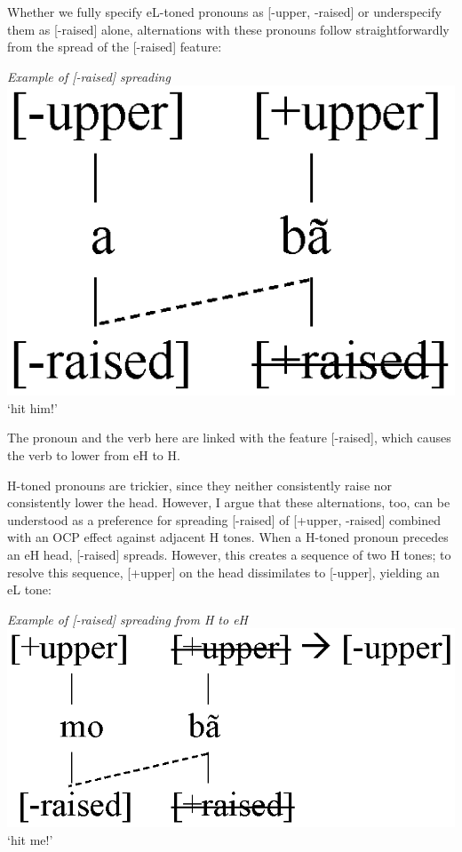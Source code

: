 \documentclass[output=paper]{langsci/langscibook}
\begin{document}
Whether we fully specify eL-toned pronouns as [-upper, -raised] or underspecify them as [-raised] alone, alternations with these pronouns follow straightforwardly from the spread of the [-raised] feature:

\ea\label{ex:mcpherson:22} {\it Example of [-raised] spreading} \\
\includegraphics[scale=.5]{figures/Lspread2.eps} \\
`hit him!' \\
\z

The pronoun and the verb here are linked with the feature [-raised], which causes the verb to lower from eH to H. 

H-toned pronouns are trickier, since they neither consistently raise nor consistently lower the head. However, I argue that these alternations, too, can be understood as a preference for spreading [-raised] of [+upper, -raised] combined with an OCP effect against adjacent H tones. When a H-toned pronoun precedes an eH head, [-raised] spreads. However, this creates a sequence of two H tones; to resolve this sequence, [+upper] on the head dissimilates to [-upper], yielding an eL tone:

\ea\label{ex:mcpherson:23} {\it Example of [-raised] spreading from H to eH} \\
\includegraphics[scale=.55]{figures/MspreadH.eps} \\
`hit me!' \\
\z
\end{document}
